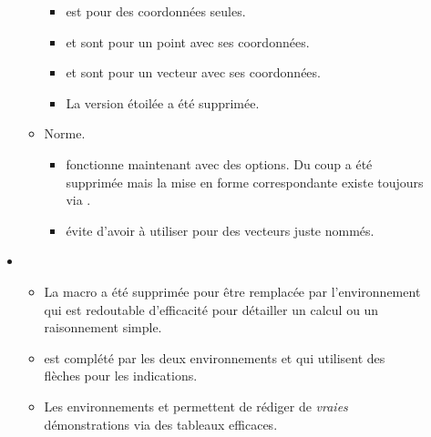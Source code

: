 \documentclass[12pt,a4paper]{article}
\begin{document}
\begin{description}
\begin{itemize}[itemsep=.5em]
\begin{itemize}[itemsep=.5em]
\begin{itemize}[itemsep=.5em, label=$\rightarrow$]
                \item {} est pour des coordonnées seules.
    
                \item {} et  sont pour un point avec ses coordonnées.
    
                \item {} et  sont pour un vecteur avec ses coordonnées.
    
                \item La version étoilée  a été supprimée. 
    	    \end{itemize}
    
    
    
            \item Norme.
            
            \begin{itemize}[itemsep=.5em, label=$\rightarrow$]
                \item {} fonctionne maintenant avec des options.
                      Du coup  a été supprimée mais la mise en forme correspondante existe toujours via .
    
    			\item {} évite d'avoir à utiliser  pour des vecteurs juste nommés.
    	    \end{itemize}
        \end{itemize}
    
    
    
    
        \separation
        \item {}
        \begin{itemize}[itemsep=.5em]
            \item La macro  a été supprimée pour être remplacée par l'environnement  qui est redoutable d'efficacité pour détailler un calcul ou un raisonnement simple.
            
            \item {} est complété par les deux environnements  et  qui utilisent des flèches pour les indications.
    
            \item Les environnements  et  permettent de rédiger de \emph{\og vraies \fg} démonstrations via des tableaux efficaces.
    

\end{itemize}
\end{itemize}
\end{description}
\end{document}
